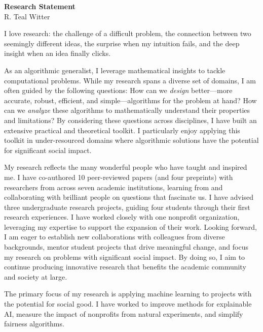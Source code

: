 \documentclass[11pt]{article}
\begin{document}
\begin{center}
	\Large \textbf{Research Statement} \\
	\vspace{.25em}
	\large{R. {\color{teal}Teal} Witter}
\end{center}

I love research: the challenge of a difficult problem, the connection between two seemingly different ideas, the surprise when my intuition fails, and the deep insight when an idea finally clicks.

As an algorithmic generalist, I leverage mathematical insights to tackle computational problems. While my research spans a diverse set of domains, I am often guided by the following questions: How can we \textit{design} better---more accurate, robust, efficient, and simple---algorithms for the problem at hand? How can we \textit{analyze} these algorithms to mathematically understand their properties and limitations? By considering these questions across disciplines, I have built an extensive practical and theoretical toolkit. I particularly enjoy applying this toolkit in under-resourced domains where algorithmic solutions have the potential for significant social impact.

My research reflects the many wonderful people who have taught and inspired me. I have co-authored 10 peer-reviewed papers (and four preprints) with researchers from across seven academic institutions, learning from and collaborating with brilliant people on questions that fascinate us. I have advised three undergraduate research projects, guiding four students through their first research experiences. I have worked closely with one nonprofit organization, leveraging my expertise to support the expansion of their work. Looking forward, I am eager to establish new collaborations with colleagues from diverse backgrounds, mentor student projects that drive meaningful change, and focus my research on problems with significant social impact. By doing so, I aim to continue producing innovative research that benefits the academic community and society at large.


The primary focus of my research is applying machine learning to projects with the potential for social good. I have worked to improve methods for explainable AI, measure the impact of nonprofits from natural experiments, and simplify fairness algorithms.
\end{document}
